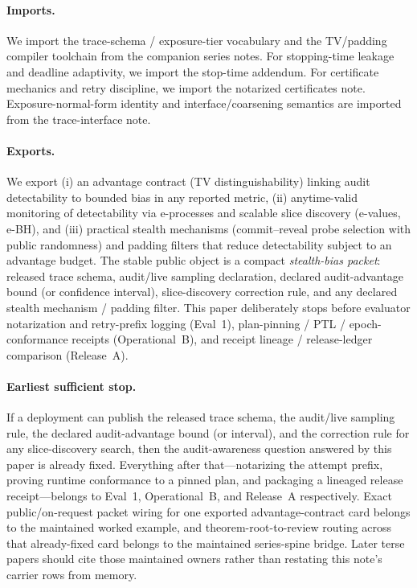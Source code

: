 \documentclass[11pt]{article}
\begin{document}
\paragraph{Imports.}
We import the trace-schema / exposure-tier vocabulary and the TV/padding compiler toolchain from the companion series notes.\cite{series:schedcompiler,series:knapsacktransport}
For stopping-time leakage and deadline adaptivity, we import the stop-time addendum.\cite{series:stoptimeaddendum}
For certificate mechanics and retry discipline, we import the notarized certificates note.\cite{series:evalnotary}
Exposure-normal-form identity and interface/coarsening semantics are imported from the trace-interface note.\cite{series:traceifaces}

\paragraph{Exports.}
We export (i) an advantage contract (TV distinguishability) linking audit detectability to bounded bias in any reported metric, (ii) anytime-valid monitoring of detectability via e-processes and scalable slice discovery (e-values, e-BH), and (iii) practical stealth mechanisms (commit--reveal probe selection with public randomness) and padding filters that reduce detectability subject to an advantage budget.
The stable public object is a compact \emph{stealth-bias packet}: released trace schema, audit/live sampling declaration, declared audit-advantage bound (or confidence interval), slice-discovery correction rule, and any declared stealth mechanism / padding filter.
This paper deliberately stops before evaluator notarization and retry-prefix logging (Eval~1), plan-pinning / PTL / epoch-conformance receipts (Operational~B), and receipt lineage / release-ledger comparison (Release~A).

\paragraph{Earliest sufficient stop.}
If a deployment can publish the released trace schema, the audit/live sampling rule, the declared audit-advantage bound (or interval), and the correction rule for any slice-discovery search, then the audit-awareness question answered by this paper is already fixed.
Everything after that---notarizing the attempt prefix, proving runtime conformance to a pinned plan, and packaging a lineaged release receipt---belongs to Eval~1, Operational~B, and Release~A respectively. Exact public/on-request packet wiring for one exported advantage-contract card belongs to the maintained worked example, and theorem-root-to-review routing across that already-fixed card belongs to the maintained series-spine bridge. Later terse papers should cite those maintained owners rather than restating this note's carrier rows from memory.\cite{series:workedexample,series:seriesspines}
\end{document}
